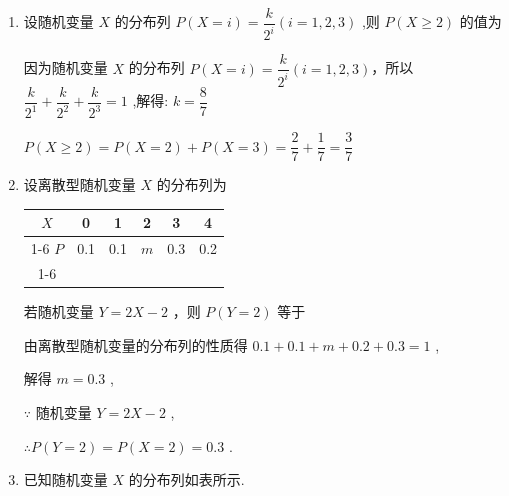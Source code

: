 \begin{enumerate}
\begin{enumerate}
\begin{jieda}
            $\therefore P\left( {X > 5}\right)  = P\left( {X = 6}\right)  + P\left( {X = 7}\right)  + P\left( {X = 8}\right)  + P\left( {X = 9}\right)  = \dfrac{4}{10} = \dfrac{2}{5}$
         \end{jieda}

         
        \item 设随机变量 $X$ 的分布列 $P\left( {X = i}\right)  = \dfrac{k}{{2}^{i}}\left( {i = 1,2,3}\right)$ ,则 $P\left( {X \geq  2}\right)$ 的值为
        \begin{jieda}
            因为随机变量 $X$ 的分布列 $P\left( {X = i}\right)  = \dfrac{k}{{2}^{i}}\left( {i = 1,2,3}\right)$，所以 $\dfrac{k}{{2}^1} + \dfrac{k}{{2}^{2}} + \dfrac{k}{{2}^{3}} = 1$ ,解得: $k = \dfrac{8}{7}$
            
            $P\left( {X \geq  2}\right)  = P\left( {X = 2}\right)  + P\left( {X = 3}\right)  = \dfrac{2}{7} + \dfrac{1}{7} = \dfrac{3}{7}$
        \end{jieda}

        \item 设离散型随机变量 $X$ 的分布列为
        
        \begin{center}
        
        \begin{tabular}{|c|c|c|c|c|c|}
        \hline
        $X$ & 0 & 1 & 2 & 3 & 4 \\
        \cline{1-6}
        $P$ & 0.1 & 0.1 & $m$ & 0.3 & 0.2 \\
        \cline{1-6}
        \hline
        \end{tabular}
        
        \end{center}
        若随机变量 $Y = {2X} - 2$ ，则 $P\left( {Y = 2}\right)$ 等于
        \begin{jieda}
            由离散型随机变量的分布列的性质得 ${0.1} + {0.1} + m + {0.2} + {0.3} = 1$ ,
            
            解得 $m = {0.3}$ ,
            
            $\because$ 随机变量 $Y = {2X} - 2$ ,
            
            $\therefore P\left( {Y = 2}\right)  = P\left( {X = 2}\right)  = {0.3}$ .
        \end{jieda}

        \item 已知随机变量 $X$ 的分布列如表所示.
        
        \begin{center}
        

\end{center}
\end{enumerate}
\end{enumerate}
